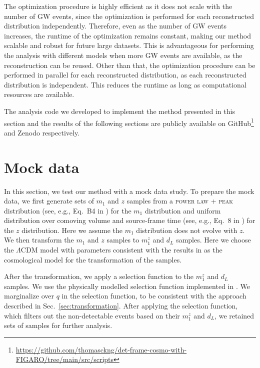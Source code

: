 \documentclass[sn-aps, pdflatex, iicol]{sn-jnl}
\begin{document}
The optimization procedure is highly efficient as it does not scale with the number of \ac{GW} events, since the optimization is performed for each reconstructed distribution independently.
Therefore, even as the number of \ac{GW} events increases, the runtime of the optimization remains constant, making our method scalable and robust for future large datasets.
This is advantageous for performing the analysis with different models when more \ac{GW} events are available, as the reconstruction can be reused.
Other than that, the optimization procedure can be performed in parallel for each reconstructed distribution, as each reconstructed distribution is independent.
This reduces the runtime as long as computational resources are available.

The analysis code we developed to implement the method presented in this section and the results of the following sections are publicly available on GitHub\footnote{\url{https://github.com/thomasckng/det-frame-cosmo-with-FIGARO/tree/main/src/scripts}} and Zenodo \citep{ng_2024_13968239} respectively.

\section{Mock data}
\label{sec:mock_data}

In this section, we test our method with a mock data study.
To prepare the mock data, we first generate  sets of $m_1$ and $z$ samples from a \textsc{power law + peak} distribution (see, e.g., Eq.~B4 in \cite{KAGRA:2021duu}) for the $m_1$ distribution and uniform distribution over comoving volume and source-frame time (see, e.g., Eq.~8 in \cite{KAGRA:2021duu}) for the $z$ distribution.
Here we assume the $m_1$ distribution does not evolve with $z$.
We then transform the $m_1$ and $z$ samples to $m^z_1$ and $d_L$ samples.
Here we choose the $\Lambda$CDM model with parameters consistent with the results in \cite{Planck:2018vyg} as the cosmological model for the transformation of the samples.

After the transformation, we apply a selection function to the $m^z_1$ and $d_L$ samples.
We use the physically modelled selection function implemented in \cite{Lorenzo-Medina:2024opt}.
We marginalize over $q$ in the selection function, to be consistent with the approach described in Sec.~\ref{sec:transformation}.
After applying the selection function, which filters out the non-detectable events based on their $m^z_1$ and $d_L$, we retained  sets of samples for further analysis.
\end{document}
